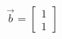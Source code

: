 \documentclass[preview]{standalone}
\begin{document}
\begin{align*}
\vec{b} = \begin{bmatrix} 1 \\ 1 \end{bmatrix}
\end{align*}
\end{document}
